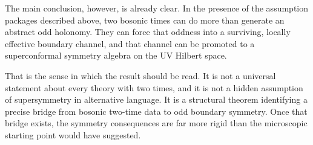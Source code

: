 \documentclass[
  aps,
  prd,
  onecolumn,
  notitlepage,
  nofootinbib,
  superscriptaddress,
  10pt
]{revtex4-2}
\theoremstyle{definition}
\theoremstyle{plain}
\begin{document}
The main conclusion, however, is already clear.  In the presence of the
assumption packages described above, two bosonic times can do more than generate an abstract odd holonomy.  They can force that oddness into a
surviving, locally effective boundary channel, and that channel can be
promoted to a superconformal symmetry algebra on the UV Hilbert space.

That is the sense in which the result should be read.  It is not a universal
statement about every theory with two times, and it is not a
hidden assumption of supersymmetry in alternative language.  It is a
structural theorem identifying a precise bridge from bosonic two-time data to
odd boundary symmetry.  Once that bridge exists, the symmetry consequences are
far more rigid than the microscopic starting point would have suggested.

\appendix
{}
\clearpage
{}
\clearpage
{}


\end{document}
